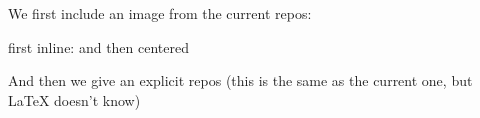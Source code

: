\documentclass[minimal]{omdoc}
\begin{document}
We first include an image from the current repos:

first inline:  and then centered



And then we give an explicit repos (this is the same as  the current one, but {\LaTeX}
doesn't know)

\end{document}
